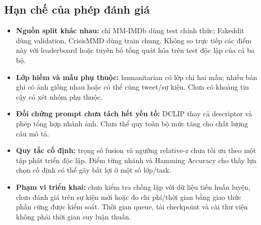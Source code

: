 \documentclass[12pt,a4paper]{article}
\begin{document}
\subsection{Hạn chế của phép đánh giá}
\begin{itemize}
\item \textbf{Nguồn split khác nhau:} chỉ MM-IMDb dùng test chính thức; Fakeddit dùng validation, CrisisMMD dùng train chung. Không so trực tiếp các điểm này với leaderboard hoặc tuyên bố tổng quát hóa trên test độc lập của cả ba bộ.
\item \textbf{Lớp hiếm và mẫu phụ thuộc:} humanitarian có lớp chỉ hai mẫu; nhiều bản ghi có ảnh giống nhau hoặc có thể cùng tweet/sự kiện. Chưa có khoảng tin cậy có xét nhóm phụ thuộc.
\item \textbf{Đối chứng prompt chưa tách hết yếu tố:} DCLIP thay cả descriptor và phép tổng hợp nhánh ảnh. Chưa thể quy toàn bộ mức tăng cho chất lượng câu mô tả.
\item \textbf{Quy tắc cố định:} trọng số fusion và ngưỡng relative-z chưa tối ưu theo một tập phát triển độc lập. Điểm từng nhánh và Hamming Accuracy cho thấy lựa chọn cố định có thể gây bất lợi ở một số lớp/task.
\item \textbf{Phạm vi triển khai:} chưa kiểm tra chồng lặp với dữ liệu tiền huấn luyện, chưa đánh giá trên sự kiện mới hoặc đo chi phí/thời gian bằng giao thức phần cứng được kiểm soát. Thời gian queue, tải checkpoint và cài thư viện không phải thời gian suy luận thuần.
\end{itemize}
\end{document}
